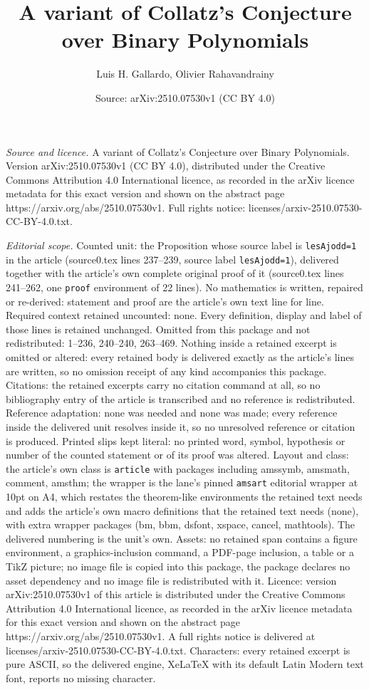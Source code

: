 \documentclass[10pt,a4paper]{amsart}
\title[A variant of Collatz's Conjecture over Binary Polynomials]{A variant of Collatz's Conjecture over Binary Polynomials}
\author{Luis H. Gallardo, Olivier Rahavandrainy}
\date{Source: arXiv:2510.07530v1 (CC BY 4.0)}
\begin{document}
\maketitle

\noindent\emph{Source and licence.} A variant of Collatz's Conjecture over Binary Polynomials. Version arXiv:2510.07530v1 (CC BY 4.0), distributed under the Creative Commons Attribution 4.0 International licence, as recorded in the arXiv licence metadata for this exact version and shown on the abstract page https://arxiv.org/abs/2510.07530v1. Full rights notice: licenses/arxiv-2510.07530-CC-BY-4.0.txt.\par\smallskip

\noindent\textit{Editorial scope.} Counted unit: the Proposition whose source label is \texttt{lesAjodd=1} in the article (source0.tex lines 237--239, source label \texttt{lesAjodd=1}), delivered together with the article's own complete original proof of it (source0.tex lines 241--262, one \texttt{proof} environment of 22 lines). No mathematics is written, repaired or re-derived: statement and proof are the article's own text line for line. Required context retained uncounted: none. Every definition, display and label of those lines is retained unchanged. Omitted from this package and not redistributed: 1--236, 240--240, 263--469. Nothing inside a retained excerpt is omitted or altered: every retained body is delivered exactly as the article's lines are written, so no omission receipt of any kind accompanies this package. Citations: the retained excerpts carry no citation command at all, so no bibliography entry of the article is transcribed and no reference is redistributed. Reference adaptation: none was needed and none was made; every reference inside the delivered unit resolves inside it, so no unresolved reference or citation is produced. Printed slips kept literal: no printed word, symbol, hypothesis or number of the counted statement or of its proof was altered. Layout and class: the article's own class is \texttt{article} with packages including amssymb, amsmath, comment, amsthm; the wrapper is the lane's pinned \texttt{amsart} editorial wrapper at 10pt on A4, which restates the theorem-like environments the retained text needs and adds the article's own macro definitions that the retained text needs (none), with extra wrapper packages (bm, bbm, dsfont, xspace, cancel, mathtools). The delivered numbering is the unit's own. Assets: no retained span contains a figure environment, a graphics-inclusion command, a PDF-page inclusion, a table or a TikZ picture; no image file is copied into this package, the package declares no asset dependency and no image file is redistributed with it. Licence: version arXiv:2510.07530v1 of this article is distributed under the Creative Commons Attribution 4.0 International licence, as recorded in the arXiv licence metadata for this exact version and shown on the abstract page https://arxiv.org/abs/2510.07530v1. A full rights notice is delivered at licenses/arxiv-2510.07530-CC-BY-4.0.txt. Characters: every retained excerpt is pure ASCII, so the delivered engine, XeLaTeX with its default Latin Modern text font, reports no missing character.
\end{document}
